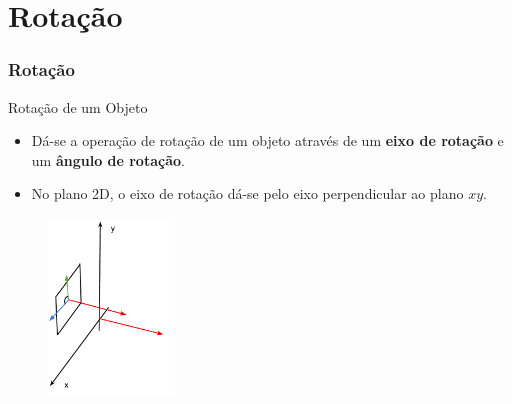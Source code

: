 \documentclass[fleqn]{beamer}
\begin{document}
\section{Rotação}
\begin{frame}
\frametitle{Rotação}


	\begin{block}{Rotação de um Objeto}
		\begin{itemize}
			\item Dá-se a operação de rotação de um objeto através de um \textbf{eixo de rotação} e um \textbf{ângulo de rotação}.
			\item No plano 2D, o eixo de rotação dá-se pelo eixo perpendicular ao plano $xy$.
		\end{itemize}
	\end{block}
	
	\begin{figure}[!h]
			\begin{center}
			\includegraphics[width=0.3\textwidth]{Figures/EixoRotacao2D}
			\end{center}
	\end{figure}
	
\end{frame}

\end{document}
